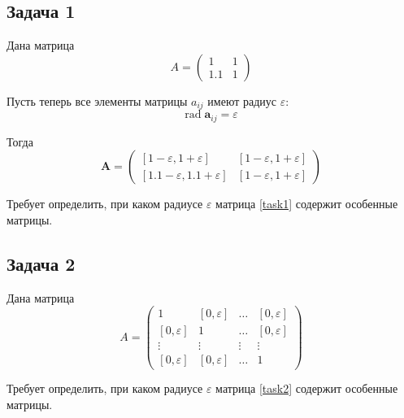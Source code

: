 \subsection{Задача 1}
Дана матрица 
\begin{equation}
A = 
\begin{pmatrix}
1 & 1\\
1.1 & 1
\end{pmatrix}
\end{equation}

Пусть теперь все элементы матрицы $a_{ij}$ имеют радиус $\varepsilon$:
\begin{equation}
\textrm{rad} \; \mathbf{a}_{ij} = \varepsilon
\end{equation}

Тогда
\begin{equation}\label{task1}
\mathbf{A} = 
\begin{pmatrix}
[1 - \varepsilon, 1 + \varepsilon] &  [1 - \varepsilon, 1 + \varepsilon] \\
[1.1 - \varepsilon, 1.1 + \varepsilon] & [1 - \varepsilon, 1 + \varepsilon]
\end{pmatrix}
\end{equation}

Требует определить, при каком радиусе $\varepsilon$ матрица \eqref{task1} содержит особенные матрицы.

\subsection{Задача 2}
Дана матрица
\begin{equation}
A = 
\begin{pmatrix}\label{task2}
1 & [0, \varepsilon] & \dots & [0, \varepsilon] \\
[0, \varepsilon] & 1 & \dots & [0, \varepsilon] \\
\vdots & \vdots & \vdots & \vdots \\
[0, \varepsilon] & [0, \varepsilon] & \dots & 1
\end{pmatrix}
\end{equation}

Требует определить, при каком радиусе $\varepsilon$ матрица \eqref{task2} содержит особенные матрицы.
